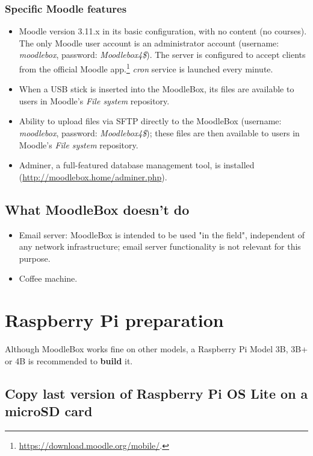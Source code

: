 \documentclass[12pt]{article}
\begin{document}
\subsubsection{Specific Moodle features}
\begin{itemize}
\item Moodle version 3.11.x in its basic configuration, with no content (no courses).
The only Moodle user account is an administrator account (username: \emph{moodlebox}, password: \emph{Moodlebox4\$}).
The server is configured to accept clients from the official Moodle app.\footnote{\url{https://download.moodle.org/mobile/}.} \textsl{cron} service is launched every minute.
\item When a USB stick is inserted into the MoodleBox, its files are available to users in Moodle's \textsl{File system} repository.
\item Ability to upload files via SFTP directly to the MoodleBox (username: \emph{moodlebox}, password: \emph{Moodlebox4\$}); these files are then available to users in Moodle's \textsl{File system} repository.
\item Adminer, a full-featured database management tool, is installed (\url{http://moodlebox.home/adminer.php}).
\end{itemize}

\subsection{What MoodleBox doesn't do}

\begin{itemize}
\item Email server: MoodleBox is intended to be used "in the field", independent of any network infrastructure; email server functionality is not relevant for this purpose.
\item Coffee machine.
\end{itemize}

\section{Raspberry Pi preparation}

Although MoodleBox works fine on other models, a Raspberry Pi Model 3B, 3B+ or 4B is recommended to \textbf{build} it.

\subsection{Copy last version of Raspberry Pi OS Lite on a microSD card}
\end{document}
